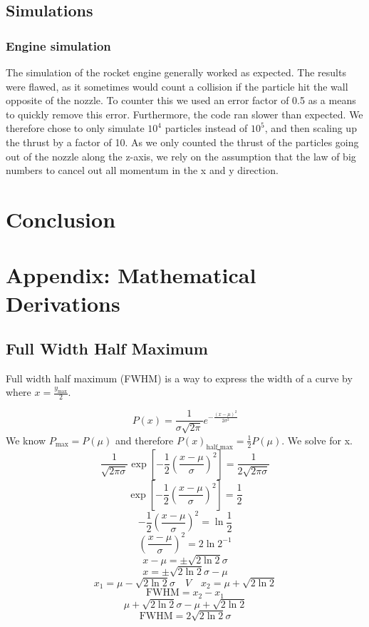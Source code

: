 \documentclass[reprint,english,notitlepage]{revtex4-2}
\begin{document}
	\subsection{Simulations}
		\subsubsection{Engine simulation}
		The simulation of the rocket engine generally worked as expected. The results were flawed, as it sometimes would count a collision if the particle hit the wall opposite of the nozzle.
		To counter this we used an error factor of 0.5 as a means to quickly remove this error. Furthermore, the code ran slower than expected. We therefore chose to only simulate $ 10^{4} $ particles instead of $ 10^{5} $, and then scaling up the thrust by a factor of 10.
		As we only counted the thrust of the particles going out of the nozzle along the z-axis, we rely on the assumption that the law of big numbers to cancel out all momentum in the x and y direction.
\section{Conclusion}

\section{Appendix: Mathematical Derivations}
	\subsection{Full Width Half Maximum}\label{der: FWHM}
	Full width half maximum (FWHM) is a way to express the width of a curve by where $ x = \frac{y_{\text{max}}}{2} $.
		
	\[
	P(x) = \frac{1}{σ \sqrt{2π} }e ^{- \frac{\left( x - μ \right) ^{2}}{2σ^{2}}}
	\]
	We know $ P_{\text{max}} = P(μ) $ and therefore $ P(x)_{\text{half max}} = \frac{1}{2} P(μ) $. We solve for x.
	\[
	\frac{1}{\sqrt{2πσ}} \exp \left[ - \frac{1}{2} \left( \frac{x - μ}{σ} \right) ^{2} \right]  = \frac{1}{2\sqrt{2πσ}}
	\]
	\[
	\exp \left[ - \frac{1}{2} \left( \frac{x - μ}{σ} \right) ^{2} \right] = \frac{1}{2}
	\]
	\[
	- \frac{1}{2} \left( \frac{x - μ}{σ} \right) ^{2} = \ln \frac{1}{2}
	\]
	\[
		\left( \frac{x - μ}{σ} \right) ^{2} = 2\ln 2^{-1}
	\]
	\[
	x - μ = ± \sqrt{2\ln 2} σ 
	\]
	\[
	x = ± \sqrt{2\ln 2} σ - μ
	\]
	\[
	x_1 = μ - \sqrt{2\ln 2} σ \quad V \quad x_2 = μ + \sqrt{2\ln 2} 
	\]
	\[
	\text{FWHM} = x_2 - x_1
	\]
	\[
	μ + \sqrt{2\ln 2} σ - μ + \sqrt{2\ln 2}
	\]
	\[
	\text{FWHM} = 2\sqrt{2\ln 2} σ 
	\]
	
\end{document}
